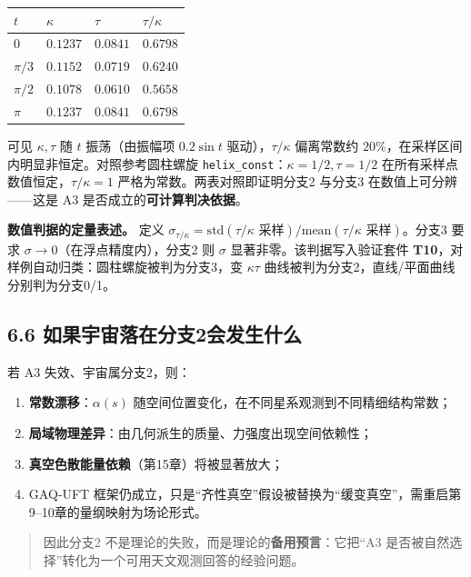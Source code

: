 \begin{longtable}[]{@{}llll@{}}
\toprule\noalign{}
\(t\) & \(\kappa\) & \(\tau\) & \(\tau/\kappa\) \\
\midrule\noalign{}
\endhead
\bottomrule\noalign{}
\endlastfoot
\(0\) & \(0.1237\) & \(0.0841\) & \(0.6798\) \\
\(\pi/3\) & \(0.1152\) & \(0.0719\) & \(0.6240\) \\
\(\pi/2\) & \(0.1078\) & \(0.0610\) & \(0.5658\) \\
\(\pi\) & \(0.1237\) & \(0.0841\) & \(0.6798\) \\
\end{longtable}

可见 \(\kappa,\tau\) 随 \(t\) 振荡（由振幅项 \(0.2\sin t\)
驱动），\(\tau/\kappa\) 偏离常数约
\(20\%\)，在采样区间内明显非恒定。对照参考圆柱螺旋
\texttt{helix\_const}：\(\kappa=1/2,\tau=1/2\)
在所有采样点数值恒定，\(\tau/\kappa=1\) 严格为常数。两表对照即证明分支2
与分支3 在数值上可分辨------这是 A3 是否成立的\textbf{可计算判决依据}。

\textbf{数值判据的定量表述。} 定义
\(\sigma_{\tau/\kappa}=\mathrm{std}(\tau/\kappa\text{ 采样})/\mathrm{mean}(\tau/\kappa\text{ 采样})\)。分支3
要求 \(\sigma\to0\)（在浮点精度内），分支2 则 \(\sigma\)
显著非零。该判据写入验证套件
\textbf{T10}，对样例自动归类：圆柱螺旋被判为分支3，变 \(\kappa\tau\)
曲线被判为分支2，直线/平面曲线分别判为分支0/1。

\subsection{6.6
如果宇宙落在分支2会发生什么}\label{ux5982ux679cux5b87ux5b99ux843dux5728ux5206ux652f2ux4f1aux53d1ux751fux4ec0ux4e48}

若 A3 失效、宇宙属分支2，则：

\begin{enumerate}
\def\labelenumi{\arabic{enumi}.}
\tightlist
\item
  \textbf{常数漂移}：\(\alpha(s)\)
  随空间位置变化，在不同星系观测到不同精细结构常数；
\item
  \textbf{局域物理差异}：由几何派生的质量、力强度出现空间依赖性；
\item
  \textbf{真空色散能量依赖}（第15章）将被显著放大；
\item
  GAQ‑UFT
  框架仍成立，只是``齐性真空''假设被替换为``缓变真空''，需重启第9--10章的量纲映射为场论形式。
\end{enumerate}

\begin{quote}
因此分支2 不是理论的失败，而是理论的\textbf{备用预言}：它把``A3
是否被自然选择''转化为一个可用天文观测回答的经验问题。
\end{quote}

